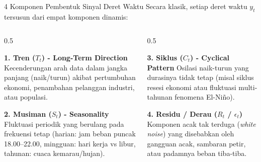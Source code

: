 \documentclass[aspectratio=169, 10pt]{beamer}
\begin{document}
\begin{frame}{4 Komponen Pembentuk Sinyal Deret Waktu}
    Secara klasik, setiap deret waktu $y_t$ tersusun dari empat komponen dinamis:
    \vspace{0.2cm}
    \begin{columns}[T]
        \begin{column}{0.5\textwidth}
            \begin{block}{\textbf{1. Tren ($T_t$) - Long-Term Direction}}
                Kecenderungan arah data dalam jangka panjang (naik/turun) akibat pertumbuhan ekonomi, penambahan pelanggan industri, atau populasi.
            \end{block}
            \begin{block}{\textbf{2. Musiman ($S_t$) - Seasonality}}
                Fluktuasi periodik yang berulang pada frekuensi tetap (harian: jam beban puncak 18.00--22.00, mingguan: hari kerja vs libur, tahunan: cuaca kemarau/hujan).
            \end{block}
        \end{column}
        \begin{column}{0.5\textwidth}
            \begin{block}{\textbf{3. Siklus ($C_t$) - Cyclical Pattern}}
                Osilasi naik-turun yang durasinya tidak tetap (misal siklus resesi ekonomi atau fluktuasi multi-tahunan fenomena El-Niño).
            \end{block}
            \begin{block}{\textbf{4. Residu / Derau ($R_t$ / $\epsilon_t$)}}
                Komponen acak tak terduga (\textit{white noise}) yang disebabkan oleh gangguan acak, sambaran petir, atau padamnya beban tiba-tiba.
            \end{block}
        \end{column}
    \end{columns}
\end{frame}
\end{document}
